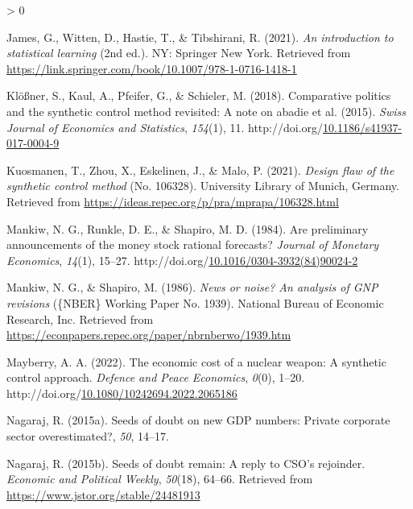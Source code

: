 \documentclass[12pt,nobind, a4paper]{reedthesis}
\newlength{\cslhangindent}
\newenvironment{CSLReferences}[2] %
{%
	\setlength{\parindent}{0pt}
	\ifodd #1 \everypar{\setlength{\hangindent}{\cslhangindent}}\ignorespaces\fi
	\ifnum #2 > 0
	\setlength{\parskip}{#2\baselineskip}
	\fi
}%
{}
\begin{document}
\begin{CSLReferences}{1}{0}
 \leavevmode\hypertarget{ref-james_introduction_2021}{}%
 James, G., Witten, D., Hastie, T., \& Tibshirani, R. (2021). \emph{An introduction to statistical learning} (2nd ed.). {NY}: Springer New York. Retrieved from \url{https://link.springer.com/book/10.1007/978-1-0716-1418-1}

 \leavevmode\hypertarget{ref-klosner_comparative_2018}{}%
 Klößner, S., Kaul, A., Pfeifer, G., \& Schieler, M. (2018). Comparative politics and the synthetic control method revisited: A note on abadie et al. (2015). \emph{Swiss Journal of Economics and Statistics}, \emph{154}(1), 11. http://doi.org/\href{https://doi.org/10.1186/s41937-017-0004-9}{10.1186/s41937-017-0004-9}

 \leavevmode\hypertarget{ref-kuosmanen_design_2021}{}%
 Kuosmanen, T., Zhou, X., Eskelinen, J., \& Malo, P. (2021). \emph{Design flaw of the synthetic control method} (No. 106328). University Library of Munich, Germany. Retrieved from \url{https://ideas.repec.org/p/pra/mprapa/106328.html}

 \leavevmode\hypertarget{ref-mankiw_are_1984}{}%
 Mankiw, N. G., Runkle, D. E., \& Shapiro, M. D. (1984). Are preliminary announcements of the money stock rational forecasts? \emph{Journal of Monetary Economics}, \emph{14}(1), 15--27. http://doi.org/\href{https://doi.org/10.1016/0304-3932(84)90024-2}{10.1016/0304-3932(84)90024-2}

 \leavevmode\hypertarget{ref-mankiw_news_1986}{}%
 Mankiw, N. G., \& Shapiro, M. (1986). \emph{News or noise? An analysis of {GNP} revisions} (\{NBER\} Working Paper No. 1939). National Bureau of Economic Research, Inc. Retrieved from \url{https://econpapers.repec.org/paper/nbrnberwo/1939.htm}

 \leavevmode\hypertarget{ref-mayberry_economic_2022}{}%
 Mayberry, A. A. (2022). The economic cost of a nuclear weapon: A synthetic control approach. \emph{Defence and Peace Economics}, \emph{0}(0), 1--20. http://doi.org/\href{https://doi.org/10.1080/10242694.2022.2065186}{10.1080/10242694.2022.2065186}

 \leavevmode\hypertarget{ref-nagaraj_seeds_2015-1}{}%
 Nagaraj, R. (2015a). Seeds of doubt on new {GDP} numbers: Private corporate sector overestimated?, \emph{50}, 14--17.

 \leavevmode\hypertarget{ref-nagaraj_seeds_2015}{}%
 Nagaraj, R. (2015b). Seeds of doubt remain: A reply to {CSO}'s rejoinder. \emph{Economic and Political Weekly}, \emph{50}(18), 64--66. Retrieved from \url{https://www.jstor.org/stable/24481913}


\end{CSLReferences}
\end{document}
